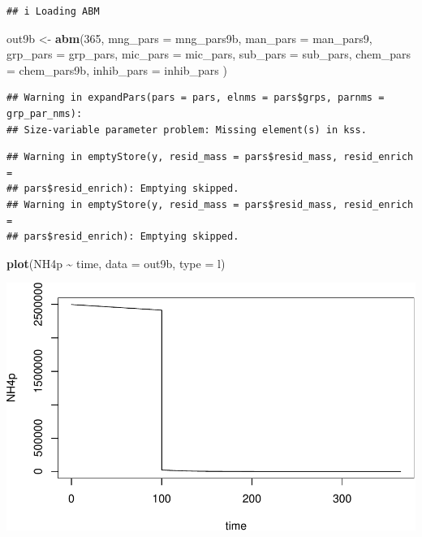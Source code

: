 \documentclass[
]{article}
\newenvironment{Shaded}{\begin{snugshade}}{\end{snugshade}}
\newcommand{\AttributeTok}[1]{\textcolor[rgb]{0.13,0.29,0.53}{#1}}
\newcommand{\DecValTok}[1]{\textcolor[rgb]{0.00,0.00,0.81}{#1}}
\newcommand{\FunctionTok}[1]{\textcolor[rgb]{0.13,0.29,0.53}{\textbf{#1}}}
\newcommand{\NormalTok}[1]{#1}
\newcommand{\OtherTok}[1]{\textcolor[rgb]{0.56,0.35,0.01}{#1}}
\newcommand{\SpecialCharTok}[1]{\textcolor[rgb]{0.81,0.36,0.00}{\textbf{#1}}}
\newcommand{\StringTok}[1]{\textcolor[rgb]{0.31,0.60,0.02}{#1}}
\begin{document}
\begin{verbatim}
## i Loading ABM
\end{verbatim}

\begin{Shaded}
\begin{Highlighting}[]
\NormalTok{out9b }\OtherTok{\textless{}{-}} \FunctionTok{abm}\NormalTok{(}\DecValTok{365}\NormalTok{,}
             \AttributeTok{mng\_pars =}\NormalTok{ mng\_pars9b,}
             \AttributeTok{man\_pars =}\NormalTok{ man\_pars9,}
             \AttributeTok{grp\_pars =}\NormalTok{ grp\_pars,}
             \AttributeTok{mic\_pars =}\NormalTok{ mic\_pars,}
             \AttributeTok{sub\_pars =}\NormalTok{ sub\_pars,}
             \AttributeTok{chem\_pars =}\NormalTok{ chem\_pars9b,}
             \AttributeTok{inhib\_pars =}\NormalTok{ inhib\_pars}
\NormalTok{)}
\end{Highlighting}
\end{Shaded}

\begin{verbatim}
## Warning in expandPars(pars = pars, elnms = pars$grps, parnms = grp_par_nms):
## Size-variable parameter problem: Missing element(s) in kss.
\end{verbatim}

\begin{verbatim}
## Warning in emptyStore(y, resid_mass = pars$resid_mass, resid_enrich =
## pars$resid_enrich): Emptying skipped.
## Warning in emptyStore(y, resid_mass = pars$resid_mass, resid_enrich =
## pars$resid_enrich): Emptying skipped.
\end{verbatim}

\begin{Shaded}
\begin{Highlighting}[]
\FunctionTok{plot}\NormalTok{(NH4p }\SpecialCharTok{\textasciitilde{}}\NormalTok{ time, }\AttributeTok{data =}\NormalTok{ out9b, }\AttributeTok{type =} \StringTok{\textquotesingle{}l\textquotesingle{}}\NormalTok{)}
\end{Highlighting}
\end{Shaded}

\includegraphics{simple_demo_files/figure-latex/unnamed-chunk-68-1.pdf}
\end{document}
